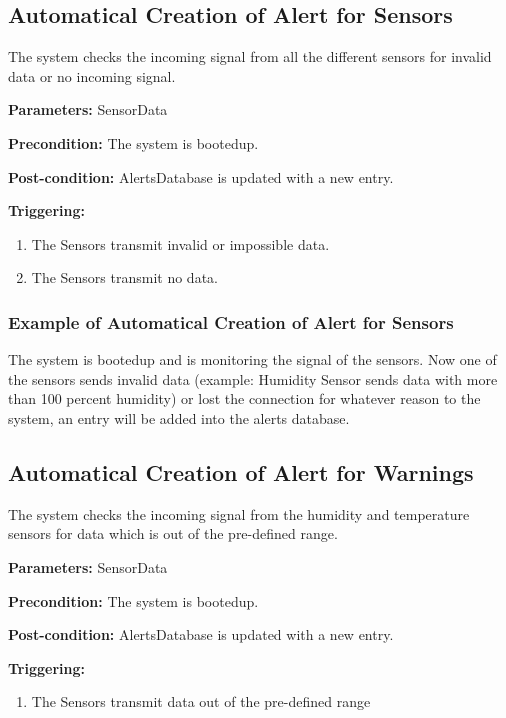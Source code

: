 \break
\subsection{Automatical Creation of Alert for Sensors}
\label{operation:AddAlertForSensors}
The system checks the incoming signal from all the different sensors for invalid
data or no incoming signal.

\begin{description}

\item \textbf{Parameters:} SensorData
\item \textbf{Precondition:} The system is bootedup.
\item \textbf{Post-condition:} AlertsDatabase is updated with a new entry.

\item \textbf{Triggering:}
\begin{enumerate}
\item The Sensors transmit invalid or impossible data.
\item The Sensors transmit no data.
\end{enumerate}
\end{description}

\subsubsection{Example of Automatical Creation of Alert for Sensors}
The system is bootedup and is monitoring the signal of the sensors.
Now one of the sensors sends invalid data (example: Humidity Sensor sends data
with more than 100 percent humidity) or lost the connection for whatever reason
to the system, an entry will be added into the alerts database.




\subsection{Automatical Creation of Alert for Warnings}
\label{operation:AddAlertForWarnigns}
The system checks the incoming signal from the humidity and temperature sensors
for data which is out of the pre-defined range.

\begin{description}

\item \textbf{Parameters:} SensorData
\item \textbf{Precondition:} The system is bootedup.
\item \textbf{Post-condition:} AlertsDatabase is updated with a new entry.

\item \textbf{Triggering:}
\begin{enumerate}
\item The Sensors transmit data out of the pre-defined range
\end{enumerate}
\end{description}

